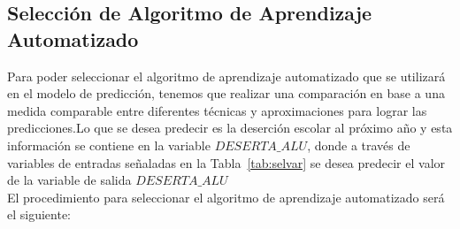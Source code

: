 \subsection{Selección de Algoritmo de Aprendizaje Automatizado}
Para poder seleccionar el algoritmo de aprendizaje automatizado que se utilizará en el modelo de predicción, tenemos que realizar una comparación en base a una medida comparable entre diferentes técnicas y aproximaciones para lograr las predicciones.Lo que se desea predecir es la deserción escolar al próximo año y esta información se contiene en la variable $DESERTA\_ALU$, donde a través de variables de entradas señaladas en la Tabla~\ref{tab:selvar} se desea predecir el valor de la variable de salida $DESERTA\_ALU$
\\El procedimiento para seleccionar el algoritmo de aprendizaje automatizado será el siguiente:
